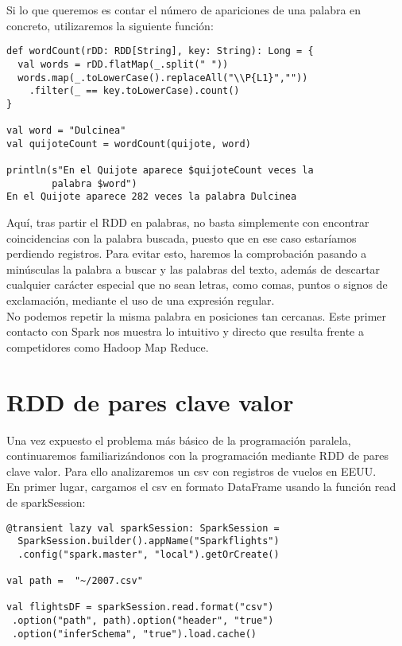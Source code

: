 Si lo que queremos es contar el número de apariciones de una palabra en concreto, utilizaremos la siguiente función:\\

\begin{lstlisting}[frame=single]
def wordCount(rDD: RDD[String], key: String): Long = {
  val words = rDD.flatMap(_.split(" "))
  words.map(_.toLowerCase().replaceAll("\\P{L1}",""))
    .filter(_ == key.toLowerCase).count()
}

val word = "Dulcinea"
val quijoteCount = wordCount(quijote, word)

println(s"En el Quijote aparece $quijoteCount veces la 
    	palabra $word")
En el Quijote aparece 282 veces la palabra Dulcinea
\end{lstlisting}

Aquí, tras partir el RDD en palabras, no basta simplemente con encontrar coincidencias con la palabra buscada, puesto que en ese caso estaríamos perdiendo registros. Para evitar esto, haremos la comprobación pasando a minúsculas la palabra a buscar y las palabras del texto, además de descartar cualquier carácter especial que no sean letras, como comas, puntos o signos de exclamación, mediante el uso de una expresión regular.\\
     
No podemos repetir la misma palabra en posiciones tan cercanas. Este primer contacto con Spark nos muestra lo intuitivo y directo que resulta frente a competidores como Hadoop Map Reduce.\\

\section{RDD de pares clave valor}

Una vez expuesto el problema más básico de la programación paralela, continuaremos familiarizándonos con la programación mediante RDD de pares clave valor. Para ello analizaremos un csv con registros de vuelos en EEUU.\\ 

En primer lugar, cargamos el csv en formato DataFrame usando la función read de sparkSession: \\

\begin{lstlisting}[frame=single]
@transient lazy val sparkSession: SparkSession =
  SparkSession.builder().appName("Sparkflights")
  .config("spark.master", "local").getOrCreate()
    
val path =  "~/2007.csv"
  
val flightsDF = sparkSession.read.format("csv")
 .option("path", path).option("header", "true")
 .option("inferSchema", "true").load.cache()
\end{lstlisting}

